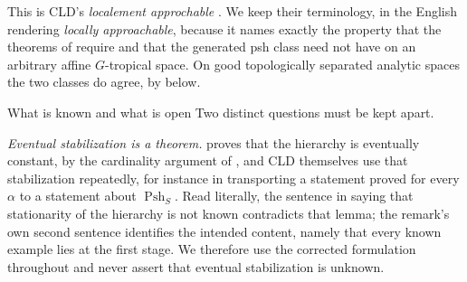 This is CLD's \emph{localement approchable}
\cite[Definition~8.1.13]{CLD25}.  We keep their terminology, in the English
rendering \emph{locally approachable}, because it names exactly the property
that the theorems of  require and that the
generated psh class need not have on an arbitrary affine $G$-tropical space.
On good topologically separated analytic spaces the two classes do agree, by
 below.

\begin{warning}{What is known and what is open}
Two distinct questions must be kept apart.

\emph{Eventual stabilization is a theorem.}
 proves that the hierarchy is eventually
constant, by the cardinality argument of \cite[Lemma~8.1.4]{CLD25}, and CLD
themselves use that stabilization repeatedly, for instance in transporting a
statement proved for every $\alpha$ to a statement about
$\operatorname{Psh}_S$.  Read literally, the sentence in
\cite[Remark~8.1.6]{CLD25} saying that stationarity of the hierarchy is not
known contradicts that lemma; the remark's own second sentence identifies the
intended content, namely that every known example lies at the first stage.
We therefore use the corrected formulation throughout and never assert that
eventual stabilization is unknown.


\end{warning}
